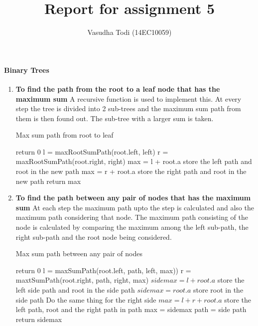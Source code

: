 \documentclass[a4paper,11pt]{article}
\title{Report for assignment 5}
\author{Vasudha Todi (14EC10059)}
\begin{document}
\maketitle


\paragraph{Binary Trees}
\begin{enumerate}
 \item \textbf{To find the path from the root to a leaf node that has the maximum sum}
A recursive function is used to implement this. At every step the tree is divided into 2 sub-trees and the maximum sum path from them is then found out. The sub-tree with a larger sum is taken.

  \begin{algorithm}
    \caption{Max sum path from root to leaf}
    \begin{algorithmic}[1]
        \State return 0
    \EndIf
    \State l = maxRootSumPath(root.left, left)
    \State r = maxRootSumPath(root.right, right)
        \State max = l + root.a
        \State store the left path and root in the new path
    \Else
        \State max = r + root.a
        \State store the right path and root in the new path
    \EndIf
    \State return max
    \end{algorithmic}
  \end{algorithm}

 \item \textbf{To find the path between any pair of nodes that has the maximum sum}
At each step the maximum path upto the step is calculated and also the maximum path considering that node. The maximum path consisting of the node is calculated by comparing the maximum among the left sub-path, the right sub-path and the root node being considered.

  \begin{algorithm}
    \caption{Max sum path between any pair of nodes}
    \begin{algorithmic}[1]
        \State return 0
    \EndIf
    \State l = maxSumPath(root.left, path, left, max))
    \State r = maxtSumPath(root.right, path, right, max)
            \State $sidemax = l + root.a$
            \State store the left side path and root in the side path
        \Else
            \State $sidemax = root.a$
            \State store root in the side path
        \EndIf
    \Else
        \State Do the same thing for the right side
    \EndIf
            \State $max = l+r+root.a$
            \State store the left path, root and the right path in path
        \Else
            \State max = sidemax
            \State path = side path
        \EndIf
    \EndIf
    \State return sidemax
    \end{algorithmic}
  \end{algorithm}
  
\end{enumerate}
\end{document}
